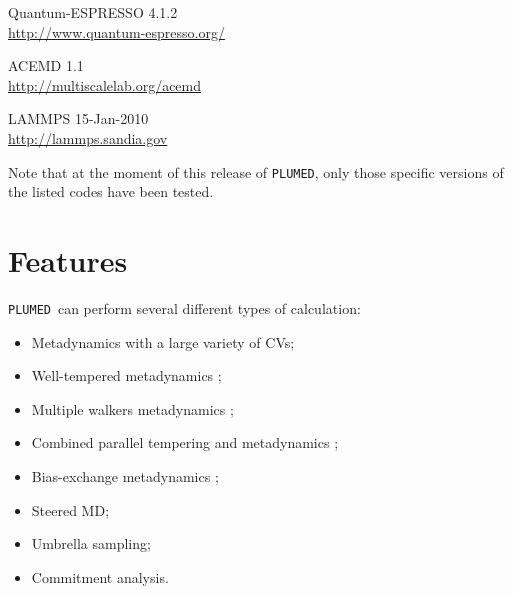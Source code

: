\documentclass[12pt,fleqn]{report}
\newcommand{\plumed}{{\tt PLUMED}}
\begin{document}
\vspace{0.3cm}

Quantum-ESPRESSO 4.1.2     \\  \url{http://www.quantum-espresso.org/}

\vspace{0.3cm}

ACEMD 1.1    \\  \url{http://multiscalelab.org/acemd}

\vspace{0.3cm}

LAMMPS 15-Jan-2010 \\ \url{http://lammps.sandia.gov}

\vspace{0.3cm}
Note that at the moment of this release of \plumed, only those specific versions of the listed codes
have been tested.

\section{Features}
\label{sec.overview}

\plumed \ can perform several different types of calculation:
\begin{itemize}
\item Metadynamics with a large variety of CVs;
\item Well-tempered metadynamics \cite{Barducci:2008};
\item Multiple walkers metadynamics \cite{multiplewalkers};
\item Combined parallel tempering and metadynamics \cite{bussi_xc};
\item Bias-exchange metadynamics \cite{piana};
\item Steered MD;
\item Umbrella sampling;
\item Commitment analysis.
\end{itemize}
\end{document}
